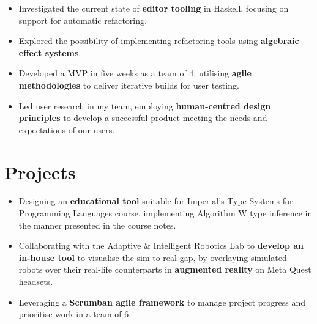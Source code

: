 \documentclass[10pt]{article}
\begin{document}
\begin{itemize}
  \item Investigated the current state of \textbf{editor tooling} in Haskell, focusing on support for automatic refactoring.
  \item Explored the possibility of implementing refactoring tools using \textbf{algebraic effect systems}.
\end{itemize}
\entrysep

\begin{itemize}
  \item Developed a MVP in five weeks as a team of 4, utilising \textbf{agile methodologies} to deliver iterative builds for user testing.
  \item Led user research in my team, employing \textbf{human-centred design principles} to develop a successful product meeting the needs and expectations of our users.
\end{itemize}

\section{Projects}

\begin{itemize}
  \item Designing an \textbf{educational tool} suitable for Imperial's Type Systems for Programming Languages course, implementing Algorithm W type inference in the manner presented in the course notes.
\end{itemize}
\entrysep

\begin{itemize}
  \item Collaborating with the Adaptive \& Intelligent Robotics Lab to \textbf{develop an in-house tool} to visualise the sim-to-real gap, by overlaying simulated robots over their real-life counterparts in \textbf{augmented reality} on Meta Quest headsets.
  \item Leveraging a \textbf{Scrumban agile framework} to manage project progress and prioritise work in a team of 6.
\end{itemize}
\entrysep
\end{document}
